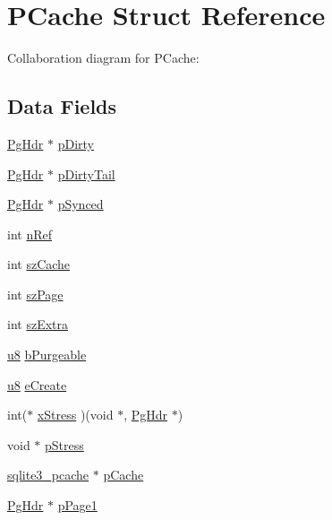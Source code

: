 \hypertarget{struct_p_cache}{}\section{P\+Cache Struct Reference}
\label{struct_p_cache}


Collaboration diagram for P\+Cache\+:
\subsection*{Data Fields}
\begin{DoxyCompactItemize}
\item 
\hyperlink{struct_pg_hdr}{Pg\+Hdr} $\ast$ \hyperlink{struct_p_cache_a2997dc2dc0dd03fdd59937ca5a4eef8a}{p\+Dirty}
\item 
\hyperlink{struct_pg_hdr}{Pg\+Hdr} $\ast$ \hyperlink{struct_p_cache_a1163420b8b2b20ac8b58adfe9273054b}{p\+Dirty\+Tail}
\item 
\hyperlink{struct_pg_hdr}{Pg\+Hdr} $\ast$ \hyperlink{struct_p_cache_a58d723edf01b07ab861fe5c6dda1c8f2}{p\+Synced}
\item 
int \hyperlink{struct_p_cache_a3c459f9ae278c22b72583c55ca01acb7}{n\+Ref}
\item 
int \hyperlink{struct_p_cache_ac2525b85a8b6f4c5396ebe335e544cde}{sz\+Cache}
\item 
int \hyperlink{struct_p_cache_a0ead96b04a1cc6dc6ec781782e82d052}{sz\+Page}
\item 
int \hyperlink{struct_p_cache_aa6d33a46ecc20cbe1700c74a12b4fb14}{sz\+Extra}
\item 
\hyperlink{sqlite3_8c_a74a0f6424ae628af25f23f0a35f6ead3}{u8} \hyperlink{struct_p_cache_ab4fb5c5f22e7ed72cc027af77cf428e1}{b\+Purgeable}
\item 
\hyperlink{sqlite3_8c_a74a0f6424ae628af25f23f0a35f6ead3}{u8} \hyperlink{struct_p_cache_a773207d76a6a250c080fac4c7d8ae00a}{e\+Create}
\item 
int($\ast$ \hyperlink{struct_p_cache_a7c60f9329f358d9c9bad04ca5e279225}{x\+Stress} )(void $\ast$, \hyperlink{struct_pg_hdr}{Pg\+Hdr} $\ast$)
\item 
void $\ast$ \hyperlink{struct_p_cache_a1d4e21ef1bf03ea7a23a01f0a04b42e8}{p\+Stress}
\item 
\hyperlink{sqlite3_8c_a096c453d937d51f7926d7d31c8e0bd2f}{sqlite3\+\_\+pcache} $\ast$ \hyperlink{struct_p_cache_afece038fa661865d1239cf93718779b0}{p\+Cache}
\item 
\hyperlink{struct_pg_hdr}{Pg\+Hdr} $\ast$ \hyperlink{struct_p_cache_aa665d8dfa432d21bc7ea1cb02e66da76}{p\+Page1}
\end{DoxyCompactItemize}


